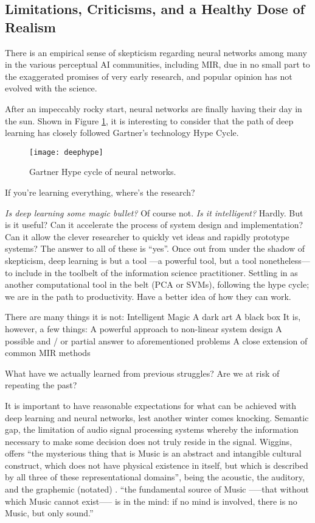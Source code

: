 \subsection{Limitations, Criticisms, and a Healthy Dose of Realism}

There is an empirical sense of skepticism regarding neural networks among many in the various perceptual AI communities, including MIR, due in no small part to the exaggerated promises of very early research, and popular opinion has not evolved with the science.


After an impeccably rocky start, neural networks are finally having their day in the sun.
Shown in Figure \ref{fig:deephype}, it is interesting to consider that the path of deep learning has closely followed Gartner's technology Hype Cycle.

\begin{figure}
\begin{centering}
\texttt{[image: deephype]}
\caption{Gartner Hype cycle of neural networks.}
\label{fig:deephype}
\end{centering}
\end{figure}

If you're learning everything, where's the research?

\emph{Is deep learning some magic bullet?}
Of course not.
\emph{Is it intelligent?}
Hardly.
But is it useful?
Can it accelerate the process of system design and implementation?
Can it allow the clever researcher to quickly vet ideas and rapidly prototype systems?
The answer to all of these is ``yes''.
Once out from under the shadow of skepticism, deep learning is but a tool ---a powerful tool, but a tool nonetheless--- to include in the toolbelt of the information science practitioner.
Settling in as another computational tool in the belt (PCA or SVMs), following the hype cycle; we are in the path to productivity.
Have a better idea of how they can work.

There are many things it is not:
Intelligent
Magic
A dark art
A black box
It is, however, a few things:
A powerful approach to non-linear system design
A possible and / or partial answer to aforementioned problems
A close extension of common MIR methods

What have we actually learned from previous struggles? Are we at risk of repeating the past?

It is important to have reasonable expectations for what can be achieved with deep learning and neural networks, lest another winter comes knocking.
Semantic gap, the limitation of audio signal processing systems whereby the information necessary to make some decision does not truly reside in the signal.
Wiggins, offers ``the mysterious thing that is Music is an abstract and intangible cultural construct, which does not have physical existence in itself, but which is described by all three of these representational domains'', being the acoustic, the auditory, and the graphemic (notated) \cite{Wiggins2009}.
``the fundamental source of Music --—that without which Music cannot exist—-- is in the mind: if no mind is involved, there is no Music, but only sound.''


